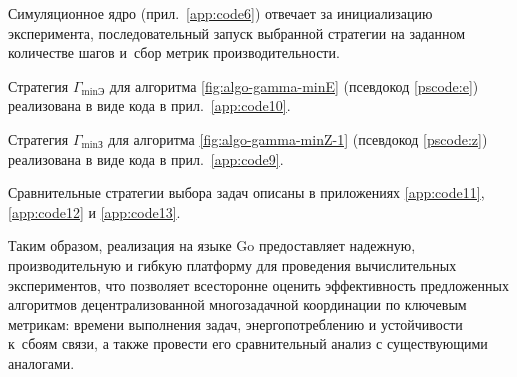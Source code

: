 Симуляционное ядро (прил.~\ref{app:code6}) отвечает за инициализацию эксперимента, последовательный запуск выбранной стратегии на заданном количестве шагов и~сбор метрик производительности.

Стратегия $\Gamma_{\min\text{Э}}$ для алгоритма \ref{fig:algo-gamma-minE} (псевдокод \ref{pscode:e}) реализована в виде кода в прил.\ \ref{app:code10}.

Стратегия $\Gamma_{\min\text{З}}$ для алгоритма \ref{fig:algo-gamma-minZ-1} (псевдокод \ref{pscode:z}) реализована в виде кода в прил.\ \ref{app:code9}.

Сравнительные стратегии выбора задач описаны в приложениях \ref{app:code11}, \ref{app:code12} и \ref{app:code13}.

Таким образом, реализация \cite{progbib1} на языке Go предоставляет надежную, производительную и гибкую платформу для проведения вычислительных экспериментов, что позволяет всесторонне оценить эффективность предложенных алгоритмов децентрализованной многозадачной координации по ключевым метрикам: времени выполнения задач, энергопотреблению и устойчивости к~сбоям связи, а также провести его сравнительный анализ с существующими аналогами.